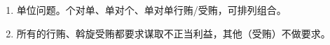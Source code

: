 \begin{enumerate}
\begin{enumerate}
\begin{enumerate}
                \end{enumerate}
          \item 不正当利益范围扩大解释。包括非法利益、不公平的竞争优势、等。
                \begin{enumerate}
                  \item {}。
                  \item {}。
                  \item {}。
                \end{enumerate}
          \item 数额。等号原理。行贿数额 = 受贿数额。基本同受贿。
        \end{enumerate}
  \item 单位问题。个对单、单对个、单对单行贿/受贿，可排列组合。
  \item 所有的行贿、斡旋受贿都要求谋取不正当利益，其他（受贿）不做要求。
\end{enumerate}
